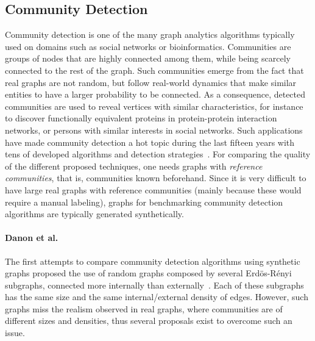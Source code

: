 \subsection{Community Detection}
\label{sec:generators_community_detection}

Community detection is one of the many graph analytics algorithms typically used
on domains such as social networks or bioinformatics. Communities are groups of nodes that are highly connected among them, while being scarcely connected to
the rest of the graph. Such communities emerge from the fact that real graphs
are not random, but follow real-world dynamics that make similar entities to
have a larger probability to be connected. As a consequence, detected
communities are used to reveal vertices with similar characteristics, for
instance to discover functionally equivalent proteins in protein-protein
interaction networks, or persons with similar interests in social networks. Such
applications have made community detection a hot topic during the last fifteen
years with tens of developed algorithms and detection
strategies~\cite{doi:10.1002/wics.1403,Kim:2015:CDM:2854006.2854013}. For
comparing the quality of the different proposed techniques, one needs graphs
with \emph{reference communities}, that is, communities known beforehand. Since
it is very difficult to have large real graphs with reference communities
(mainly because these would require a manual labeling), graphs for benchmarking
community detection algorithms are typically generated synthetically.

\paragraph{Danon et al.} The first attempts to compare community detection algorithms using synthetic
graphs proposed the use of random graphs composed by several Erd\"{o}s-R\'{e}nyi
subgraphs, connected more internally than externally~\cite{danon2005comparing}.
Each of these subgraphs has the same size and the same internal/external density
of edges. However, such graphs miss the realism observed in real graphs, where
communities are of different sizes and densities, thus several proposals exist
to overcome such an issue.

